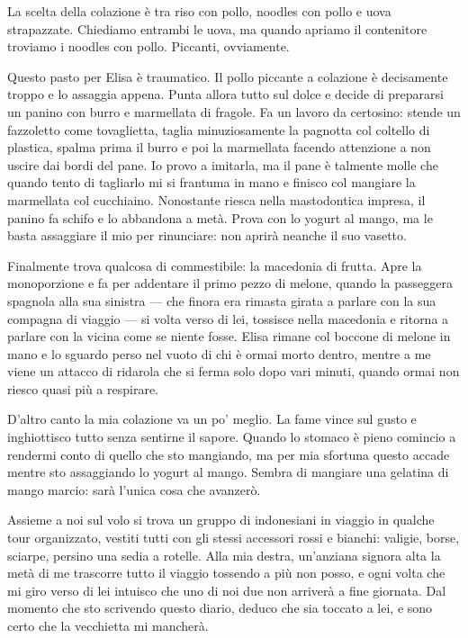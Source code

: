 La scelta della colazione è tra riso con pollo, noodles con pollo e uova strapazzate. Chiediamo entrambi le uova, ma quando apriamo il contenitore troviamo i noodles con pollo. Piccanti, ovviamente.

Questo pasto per Elisa è traumatico. Il pollo piccante a colazione è decisamente troppo e lo assaggia appena. Punta allora tutto sul dolce e decide di prepararsi un panino con burro e marmellata di fragole. Fa un lavoro da certosino: stende un fazzoletto come tovaglietta, taglia minuziosamente la pagnotta col coltello di plastica, spalma prima il burro e poi la marmellata facendo attenzione a non uscire dai bordi del pane. Io provo a imitarla, ma il pane è talmente molle che quando tento di tagliarlo mi si frantuma in mano e finisco col mangiare la marmellata col cucchiaino. Nonostante riesca nella mastodontica impresa, il panino fa schifo e lo abbandona a metà. Prova con lo yogurt al mango, ma le basta assaggiare il mio per rinunciare: non aprirà neanche il suo vasetto.

Finalmente trova qualcosa di commestibile: la macedonia di frutta. Apre la monoporzione e fa per addentare il primo pezzo di melone, quando la passeggera spagnola alla sua sinistra — che finora era rimasta girata a parlare con la sua compagna di viaggio — si volta verso di lei, tossisce nella macedonia e ritorna a parlare con la vicina come se niente fosse. Elisa rimane col boccone di melone in mano e lo sguardo perso nel vuoto di chi è ormai morto dentro, mentre a me viene un attacco di ridarola che si ferma solo dopo vari minuti, quando ormai non riesco quasi più a respirare.

D'altro canto la mia colazione va un po' meglio. La fame vince sul gusto e inghiottisco tutto senza sentirne il sapore. Quando lo stomaco è pieno comincio a rendermi conto di quello che sto mangiando, ma per mia sfortuna questo accade mentre sto assaggiando lo yogurt al mango. Sembra di mangiare una gelatina di mango marcio: sarà l'unica cosa che avanzerò.

Assieme a noi sul volo si trova un gruppo di indonesiani in viaggio in qualche tour organizzato, vestiti tutti con gli stessi accessori rossi e bianchi: valigie, borse, sciarpe, persino una sedia a rotelle. Alla mia destra, un'anziana signora alta la metà di me trascorre tutto il viaggio tossendo a più non posso, e ogni volta che mi giro verso di lei intuisco che uno di noi due non arriverà a fine giornata. Dal momento che sto scrivendo questo diario, deduco che sia toccato a lei, e sono certo che la vecchietta mi mancherà.

